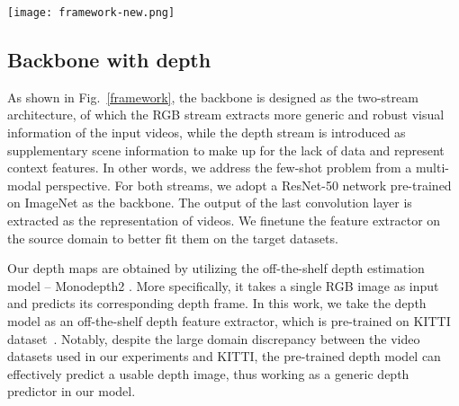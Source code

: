 \documentclass[sigconf]{acmart}
\begin{document}
	
	
	
	
	
	
	\begin{figure*}[h!]\centering
		{\texttt{[image: framework-new.png]}}
		\caption{The schematic illustration of our few-shot video action recognition model. For each video contained in the episode, the  pair is first sampled by our \emph{temporal asynchronization augmentation mechanism} as the input to our model. Then two feature extractors are used to extract the feature maps. After that, an \emph{depth guided adaptive instance normalization (DGAdaIN) fusion module} is applied to fuse the feature maps. Finally, all the fused features of videos in support set and query set are fed into our few-shot classifier to predict the action of the query video.}
		\label{framework} \end{figure*}
	
	
	
	
	\subsection{Backbone with depth}\label{backbone}
	As shown in Fig.~\ref{framework}, the backbone is designed as the two-stream architecture, of which the RGB stream extracts more generic and robust visual information of the input videos, while the depth stream is introduced as supplementary scene information to make up for the lack of data and represent context features. In other words, we address the few-shot problem from a multi-modal perspective. For both streams, we adopt a ResNet-50 \cite{he2016deep} network pre-trained on ImageNet \cite{deng2009imagenet} as the backbone. The output of the last convolution layer is extracted as the representation of videos. We finetune the feature extractor on the source domain to better fit them on the target datasets.   
	
	
	Our depth maps are obtained by utilizing the off-the-shelf depth estimation model -- Monodepth2 \cite{godard2019digging}. 
	More specifically, it takes a single RGB image as input and predicts its corresponding depth frame. In this work, we take the depth model as an off-the-shelf depth feature extractor, which is pre-trained on KITTI dataset~\cite{geiger2012we}.  Notably, despite the large domain discrepancy between the video datasets used in our experiments and KITTI, the pre-trained depth model can effectively predict a usable depth image,  thus working as a generic depth predictor in our model. 
	
\end{document}
